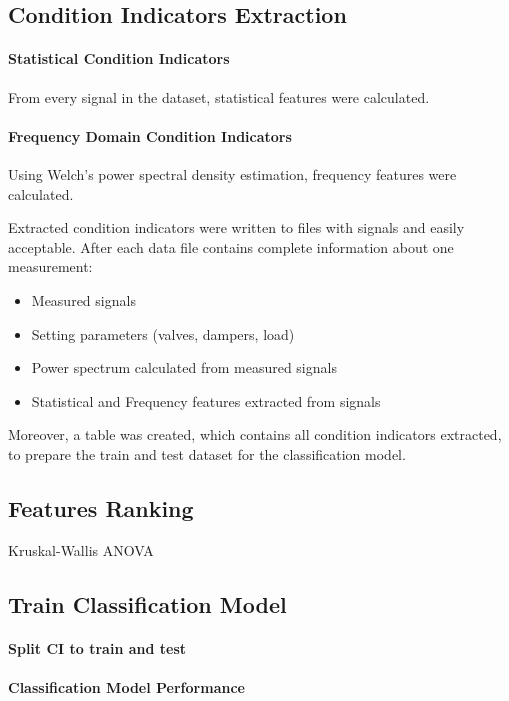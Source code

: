 \subsection{Condition Indicators Extraction}
\paragraph{Statistical Condition Indicators}
From every signal in the dataset, statistical features were calculated.

\paragraph{Frequency Domain Condition Indicators}
Using Welch's power spectral density estimation, frequency features were
calculated. 


Extracted condition indicators were written to files with signals and
easily acceptable. After each data file contains complete information about
one measurement:
\begin{itemize}
    \item Measured signals
    \item Setting parameters (valves, dampers, load)
    \item Power spectrum calculated from measured signals
    \item Statistical and Frequency features extracted from signals
\end{itemize}

Moreover, a table was created, which contains all condition indicators
extracted, to prepare the train and test dataset for the classification
model.

\subsection{Features Ranking}
Kruskal-Wallis ANOVA

\subsection{Train Classification Model}

\paragraph{Split CI to train and test}

\paragraph{Classification Model Performance}

